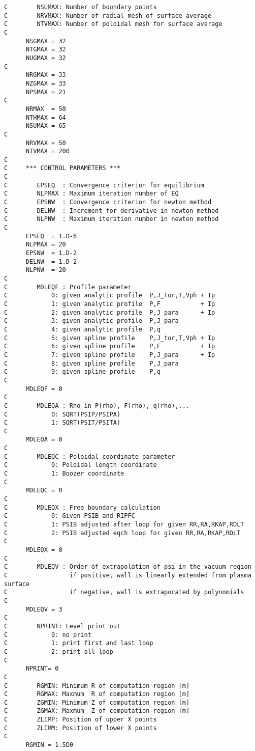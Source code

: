 \documentclass[11pt]{article}
\begin{document}
{\begin{verbatim}
C        NSUMAX: Number of boundary points
C        NRVMAX: Number of radial mesh of surface average
C        NTVMAX: Number of poloidal mesh for surface average
C
      NSGMAX = 32
      NTGMAX = 32
      NUGMAX = 32
C
      NRGMAX = 33
      NZGMAX = 33
      NPSMAX = 21
C
      NRMAX  = 50
      NTHMAX = 64
      NSUMAX = 65
C
      NRVMAX = 50
      NTVMAX = 200
C
C     *** CONTROL PARAMETERS ***
C
C        EPSEQ  : Convergence criterion for equilibrium
C        NLPMAX : Maximum iteration number of EQ
C        EPSNW  : Convergence criterion for newton method
C        DELNW  : Increment for derivative in newton method
C        NLPNW  : Maximum iteration number in newton method
C
      EPSEQ  = 1.D-6
      NLPMAX = 20
      EPSNW  = 1.D-2
      DELNW  = 1.D-2
      NLPNW  = 20
C
C        MDLEQF : Profile parameter
C            0: given analytic profile  P,J_tor,T,Vph + Ip
C            1: given analytic profile  P,F           + Ip
C            2: given analytic profile  P,J_para      + Ip
C            3: given analytic profile  P,J_para
C            4: given analytic profile  P,q
C            5: given spline profile    P,J_tor,T,Vph + Ip
C            6: given spline profile    P,F           + Ip
C            7: given spline profile    P,J_para      + Ip
C            8: given spline profile    P,J_para
C            9: given spline profile    P,q
C
      MDLEQF = 0
C
C        MDLEQA : Rho in P(rho), F(rho), q(rho),...
C            0: SQRT(PSIP/PSIPA)
C            1: SQRT(PSIT/PSITA)
C
      MDLEQA = 0
C
C        MDLEQC : Poloidal coordinate parameter
C            0: Poloidal length coordinate
C            1: Boozer coordinate
C
      MDLEQC = 0
C
C        MDLEQX : Free boundary calculation
C            0: Given PSIB and RIPFC
C            1: PSIB adjusted after loop for given RR,RA,RKAP,RDLT
C            2: PSIB adjusted eqch loop for given RR,RA,RKAP,RDLT
C
      MDLEQX = 0
C
C        MDLEQV : Order of extrapolation of psi in the vacuum region
C                 if positive, wall is linearly extended from plasma surface
C                 if negative, wall is extraporated by polynomials
C
      MDLEQV = 3
C
C        NPRINT: Level print out
C            0: no print
C            1: print first and last loop
C            2: print all loop
C
      NPRINT= 0
C
C        RGMIN: Minimum R of computation region [m]
C        RGMAX: Maxmum  R of computation region [m]
C        ZGMIN: Minimum Z of computation region [m]
C        ZGMAX: Maxmum  Z of computation region [m]
C        ZLIMP: Position of upper X points
C        ZLIMM: Position of lower X points
C
      RGMIN = 1.5D0

\end{verbatim}}
\end{document}
